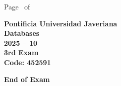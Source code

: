 \documentclass[11pt, addpoints]{exam}\usepackage[utf8]{inputenc}
\begin{document}
\begin{coverpages}
\begin{center}
			\vspace{3mm}
			\leavevmode \hspace{5mm} 
		\end{center}
	\end{coverpages}

	\footer{} {Page \thepage\ of \numpages} {}

	\centering
	\textbf{\Large Pontificia Universidad Javeriana}\\
	\textbf{\Large Databases} \\
	\textbf{\large 2025 -- 10} \\
	\textbf{\large 3rd Exam} \\
	\textbf{Code: 452591}


	\begin{questions}
		
		
		
		
		
		
		
		
		
		
		
		
		
		
		
		
		
		
		
		
	\end{questions}

	\vspace{5mm}
	\noindent \textbf{End of Exam}
\end{document}
